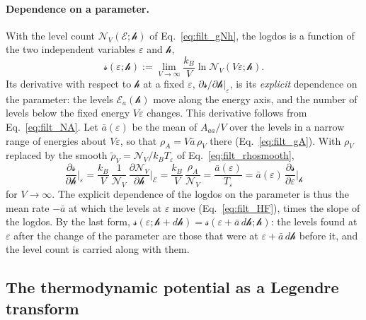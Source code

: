 \documentclass[10pt,a4paper]{article}
\theoremstyle{plain}
\newcommand{\cN}{\mathcal{N}}   %
\newcommand{\lndos}{{logdos}}  %
\newcommand{\hfield}{\mathscr{h}}  %
\newcommand{\enrg}{\mathcal{E}}  %
\newcommand{\lds}{\mathscr{s}}  %
\begin{document}
\paragraph{Dependence on a parameter.} With the level count
$\cN_V(\enrg;\hfield)$ of Eq.~\eqref{eq:filt_gNh}, the \lndos{} is a function
of the two independent variables $\varepsilon$ and $\hfield$,
\begin{equation}\label{eq:filt_sdefh}
  \lds(\varepsilon;\hfield):=\lim_{V\to\infty}\frac{k_B}{V}\ln\cN_V(V\varepsilon;\hfield) .
\end{equation}
Its derivative with respect to $\hfield$ at a fixed $\varepsilon$,
$\partial\lds/\partial\hfield|_{\varepsilon}$, is its \emph{explicit}
dependence on the parameter: the levels $\enrg_a(\hfield)$ move along the
energy axis, and the number of levels below the fixed energy $V\varepsilon$
changes. This derivative follows from Eq.~\eqref{eq:filt_NA}. Let
$\bar a(\varepsilon)$ be the mean of $A_{aa}/V$ over the levels in a narrow
range of energies about $V\varepsilon$, so that $\rho_A=V\bar a\,\rho_V$ there
(Eq.~\eqref{eq:filt_gA}). With $\rho_V$ replaced by the smooth
$\tilde\rho_V=\cN_V/k_BT_\varepsilon$ of Eq.~\eqref{eq:filt_rhosmooth},
\begin{equation}\label{eq:filt_sh}
  \frac{\partial\lds}{\partial\hfield}\bigg|_{\varepsilon}
  =\frac{k_B}{V}\,\frac{1}{\cN_V}\,\frac{\partial\cN_V}{\partial\hfield}\bigg|_{\enrg}
  =\frac{k_B}{V}\,\frac{\rho_A}{\cN_V}
  =\frac{\bar a(\varepsilon)}{T_\varepsilon}
  =\bar a(\varepsilon)\,\frac{\partial\lds}{\partial\varepsilon}\bigg|_{\hfield}
\end{equation}
for $V\to\infty$. The explicit dependence of the \lndos{} on the parameter is
thus the mean rate $-\bar a$ at which the levels at $\varepsilon$ move
(Eq.~\eqref{eq:filt_HF}), times the slope of the \lndos. By the last form,
$\lds(\varepsilon;\hfield+d\hfield)=\lds(\varepsilon+\bar a\,d\hfield;\hfield)$: the levels found at $\varepsilon$
after the change of the parameter are those that were at
$\varepsilon+\bar a\,d\hfield$ before it, and the level count is carried
along with them.

\subsection{The thermodynamic potential as a Legendre transform}
\label{sec:large_laplace}
\end{document}
